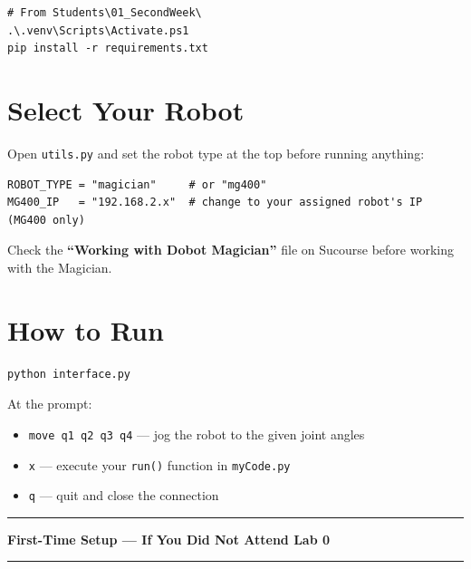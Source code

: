 \documentclass[11pt,a4paper]{article}
\begin{document}
\begin{tcolorbox}[setupbox, title={Windows (PowerShell)}]
\begin{lstlisting}[style=code]
# From Students\01_SecondWeek\
.\.venv\Scripts\Activate.ps1
pip install -r requirements.txt
\end{lstlisting}
\end{tcolorbox}

\section*{Select Your Robot}

Open \texttt{utils.py} and set the robot type at the top before running anything:

\begin{lstlisting}[style=code]
ROBOT_TYPE = "magician"     # or "mg400"
MG400_IP   = "192.168.2.x"  # change to your assigned robot's IP (MG400 only)
\end{lstlisting}

\begin{tcolorbox}[infobox, title={If you are using the Dobot Magician}]
Check the \textbf{``Working with Dobot Magician''} file on Sucourse before working
with the Magician.
\end{tcolorbox}

\section*{How to Run}

\begin{lstlisting}[style=code]
python interface.py
\end{lstlisting}

At the prompt:
\begin{itemize}[nosep]
  \item \texttt{move q1 q2 q3 q4} --- jog the robot to the given joint angles
  \item \texttt{x} --- execute your \texttt{run()} function in \texttt{myCode.py}
  \item \texttt{q} --- quit and close the connection
\end{itemize}

\newpage
\rule{\linewidth}{1pt}
\begin{center}
  {\large\bfseries First-Time Setup --- If You Did Not Attend Lab 0}
\end{center}
\rule{\linewidth}{1pt}
\end{document}

